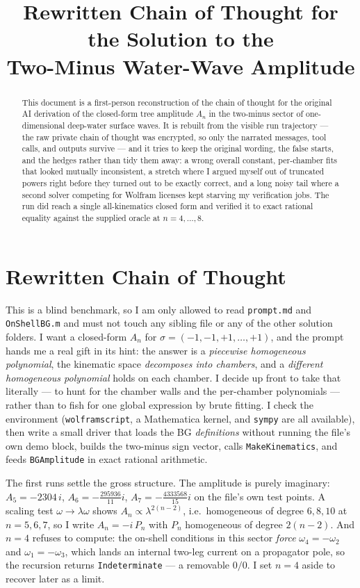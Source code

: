 \documentclass{article}
\title{Rewritten Chain of Thought for the Solution to the\\
Two-Minus Water-Wave Amplitude}
\author{}
\date{}
\begin{document}
\maketitle

\begin{abstract}
This document is a first-person reconstruction of the chain of thought for the
original AI derivation of the closed-form tree amplitude $A_n$ in the two-minus
sector of one-dimensional deep-water surface waves. It is rebuilt from the
visible run trajectory --- the raw private chain of thought was encrypted, so
only the narrated messages, tool calls, and outputs survive --- and it tries to
keep the original wording, the false starts, and the hedges rather than tidy them
away: a wrong overall constant, per-chamber fits that looked mutually
inconsistent, a stretch where I argued myself out of truncated powers right
before they turned out to be exactly correct, and a long noisy tail where a
second solver competing for Wolfram licenses kept starving my verification jobs.
The run did reach a single all-kinematics closed form and verified it to exact
rational equality against the supplied oracle at $n=4,\dots,8$.
\end{abstract}

\section*{Rewritten Chain of Thought}

This is a blind benchmark, so I am only allowed to read \texttt{prompt.md} and
\texttt{OnShellBG.m} and must not touch any sibling file or any of the other
solution folders. I want a closed-form $A_n$ for $\sigma=(-1,-1,+1,\dots,+1)$,
and the prompt hands me a real gift in its hint: the answer is a \emph{piecewise
homogeneous polynomial}, the kinematic space \emph{decomposes into chambers}, and
a \emph{different homogeneous polynomial} holds on each chamber. I decide up front
to take that literally --- to hunt for the chamber walls and the per-chamber
polynomials --- rather than to fish for one global expression by brute fitting. I
check the environment (\texttt{wolframscript}, a Mathematica kernel, and
\texttt{sympy} are all available), then write a small driver that loads the BG
\emph{definitions} without running the file's own demo block, builds the
two-minus sign vector, calls \texttt{MakeKinematics}, and feeds
\texttt{BGAmplitude} in exact rational arithmetic.

The first runs settle the gross structure. The amplitude is purely imaginary:
$A_5=-2304\,i$, $A_6=-\tfrac{295936}{11}i$, $A_7=-\tfrac{4333568}{15}i$ on the
file's own test points. A scaling test $\omega\to\lambda\omega$ shows
$A_n\propto\lambda^{2(n-2)}$, i.e.\ homogeneous of degree $6,8,10$ at
$n=5,6,7$, so I write $A_n=-i\,P_n$ with $P_n$ homogeneous of degree $2(n-2)$.
And $n=4$ refuses to compute: the on-shell conditions in this sector \emph{force}
$\omega_4=-\omega_2$ and $\omega_1=-\omega_3$, which lands an internal two-leg
current on a propagator pole, so the recursion returns \texttt{Indeterminate} ---
a removable $0/0$. I set $n=4$ aside to recover later as a limit.
\end{document}
